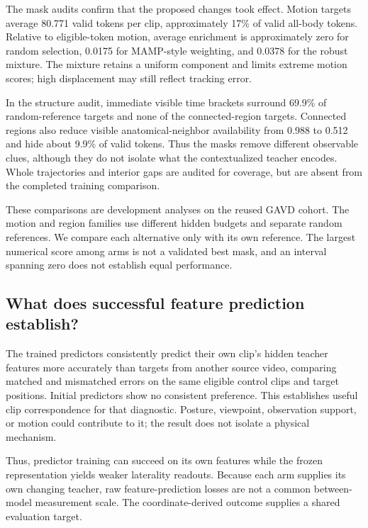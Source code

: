 \documentclass{article}
\begin{document}
The mask audits confirm that the proposed changes took effect. Motion targets average 80.771 valid tokens per clip, approximately 17\% of valid all-body tokens. Relative to eligible-token motion, average enrichment is approximately zero for random selection, 0.0175 for MAMP-style weighting, and 0.0378 for the robust mixture. The mixture retains a uniform component and limits extreme motion scores; high displacement may still reflect tracking error.

In the structure audit, immediate visible time brackets surround 69.9\% of random-reference targets and none of the connected-region targets. Connected regions also reduce visible anatomical-neighbor availability from 0.988 to 0.512 and hide about 9.9\% of valid tokens. Thus the masks remove different observable clues, although they do not isolate what the contextualized teacher encodes. Whole trajectories and interior gaps are audited for coverage, but are absent from the completed training comparison.

These comparisons are development analyses on the reused GAVD cohort. The motion and region families use different hidden budgets and separate random references. We compare each alternative only with its own reference. The largest numerical score among arms is not a validated best mask, and an interval spanning zero does not establish equal performance.

\subsection{What does successful feature prediction establish?}\label{what-does-successful-feature-prediction-establish}

The trained predictors consistently predict their own clip's hidden teacher features more accurately than targets from another source video, comparing matched and mismatched errors on the same eligible control clips and target positions. Initial predictors show no consistent preference. This establishes useful clip correspondence for that diagnostic. Posture, viewpoint, observation support, or motion could contribute to it; the result does not isolate a physical mechanism.

Thus, predictor training can succeed on its own features while the frozen representation yields weaker laterality readouts. Because each arm supplies its own changing teacher, raw feature-prediction losses are not a common between-model measurement scale. The coordinate-derived outcome supplies a shared evaluation target.
\end{document}
